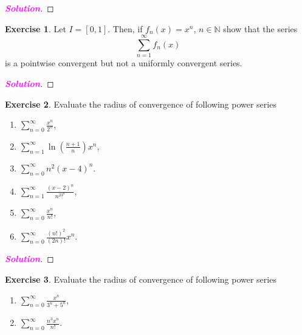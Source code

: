 \documentclass[12pt,openany]{book}
\theoremstyle{definition}
\newtheorem{exercise}{Exercise}[chapter]
\newcommand{\sol}{\textcolor{magenta}{\bf Solution}}
\begin{document}
	\begin{proof}[\sol]
		
	\end{proof}
	\begin{tcolorbox}[colframe=execolor, title={\color{white}\bf}]
		\begin{exercise}
			Let \( I = [0, 1] \). Then, if \( f_n(x) = x^n \), \( n \in \mathbb{N} \) show that the series
			\[ \sum_{n=1}^{\infty} f_n(x) \]
			is a pointwise convergent but not a uniformly convergent series.
		\end{exercise}
	\end{tcolorbox}
	\begin{proof}[\sol]
		
	\end{proof}
	\begin{tcolorbox}[colframe=execolor, title={\color{white}\bf}]
		\begin{exercise}
			Evaluate the radius of convergence of following power series
			\begin{enumerate}
				\item \(\displaystyle\sum_{n=0}^{\infty} \frac{x^n}{2^n}\),
				\item \(\displaystyle\sum_{n=1}^{\infty} \ln \left( \frac{n+1}{n} \right) x^n\),
				\item \(\displaystyle\sum_{n=0}^{\infty} n^2(x - 4)^n\).\item \(\displaystyle\sum_{n=1}^{\infty} \frac{(x-2)^n}{n^23^n}\),
				\item \(\displaystyle\sum_{n=0}^{\infty} \frac{x^n}{n!}\),
				\item \(\displaystyle\sum_{n=0}^{\infty} \frac{(n!)^2}{(2n)!}x^n\).
			\end{enumerate}
		\end{exercise}
	\end{tcolorbox}
	\begin{proof}[\sol]
		
	\end{proof}
	\begin{tcolorbox}[colframe=execolor, title={\color{white}\bf}]
		\begin{exercise}
			Evaluate the radius of convergence of following power series
			\begin{enumerate}
				\item \(\displaystyle\sum_{n=0}^{\infty} \frac{x^n}{3^n + 5^n}\),
				\item \(\displaystyle\sum_{n=0}^{\infty} \frac{n^3x^n}{n!}\).
			\end{enumerate}
		\end{exercise}
	\end{tcolorbox}
\end{document}
